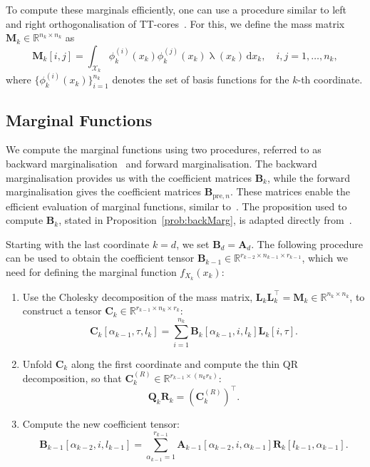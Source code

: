 To compute these marginals efficiently, one can use a procedure similar to left and right orthogonalisation of TT-cores~\cite{oseledets2011tensor}. For this, we define the mass matrix $\bm{M}_k \in \mathbb{R}^{n_k \times n_k}$ as
\begin{equation}
	\bm{M}_k[i, j] = \int_{\mathcal{X}_k} \phi^{(i)}_k(x_k) \phi^{(j)}_k(x_k) \uplambda(x_k) \, \mathrm{d}x_k, \quad i, j = 1, \dots, n_k,
\end{equation}
where $\{\phi^{(i)}_k(x_k)\}_{i=1}^{n_k}$ denotes the set of basis functions for the $k$-th coordinate.



\subsection{Marginal Functions}
We compute the marginal functions using two procedures, referred to as backward marginalisation~\cite{cui2022deep} and forward marginalisation. The backward marginalisation provides us with the coefficient matrices $\bm{B}_k$, while the forward marginalisation gives the coefficient matrices $\bm{B}_{\text{pre}, n}$. These matrices enable the efficient evaluation of marginal functions, similar to~\cite{cui2022deep}.
The proposition used to compute $\bm{B}_k$, stated in Proposition~\ref{prob:backMarg}, is adapted directly from~\cite{cui2022deep}.

\begin{prop}
	\label{prob:backMarg}
	Starting with the last coordinate $k = d$, we set $\bm{B}_d = \bm{A}_d$. The following procedure can be used to obtain the coefficient tensor $\bm{B}_{k-1} \in \mathbb{R}^{r_{k-2} \times n_{k-1} \times r_{k-1}}$, which we need for defining the marginal function $f_{X_k}(x_k)$:
	\begin{enumerate}
		\item Use the Cholesky decomposition of the mass matrix, $\bm{L}_k \bm{L}_k^\top = \bm{M}_k \in \mathbb{R}^{n_k \times n_k}$, to construct a tensor $\bm{C}_k \in \mathbb{R}^{r_{k-1} \times n_k \times r_k}$:
		\begin{equation}
			\bm{C}_k[\alpha_{k-1}, \tau, l_k] = \sum_{i=1}^{n_k} \bm{B}_k[\alpha_{k-1}, i, l_k] \bm{L}_k[i, \tau].
		\end{equation}
		\item Unfold $\bm{C}_k$ along the first coordinate and compute the thin QR decomposition, so that $\bm{C}_k^{(R)} \in \mathbb{R}^{r_{k-1} \times (n_k r_k)}$:
		\begin{equation}
			\bm{Q}_k \bm{R}_k = {(\bm{C}_k^{(R)})}^{\top}.
		\end{equation}
		\item Compute the new coefficient tensor:
		\begin{equation}
			\bm{B}_{k-1}[\alpha_{k-2}, i, l_{k-1}] = \sum_{\alpha_{k-1}=1}^{r_{k-1}} \bm{A}_{k-1}[\alpha_{k-2}, i, \alpha_{k-1}] \bm{R}_k[l_{k-1}, \alpha_{k-1}].
		\end{equation}
	\end{enumerate}
\end{prop}

